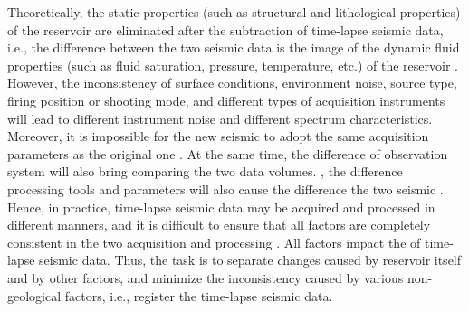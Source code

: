 Theoretically, the static properties (such as structural and lithological properties) of the reservoir are eliminated after the subtraction of time-lapse seismic data, i.e., the difference between the two seismic data is the image of the dynamic fluid properties (such as fluid saturation, pressure, temperature, etc.) of the reservoir  \cite[]{grana2015bayesian}.
However,  the inconsistency of surface conditions, environment noise, source type, firing position or shooting mode, and different types of acquisition instruments will lead to different instrument noise and different spectrum characteristics. 
Moreover, it is impossible for the new seismic  to adopt the same acquisition parameters as the original one  \cite[]{Tucker2000time}. 
At the same time, the difference of observation system will also bring   comparing the two data volumes. 
, the difference  processing tools and parameters will also cause the difference  the two seismic .
Hence, in practice, time-lapse seismic data may be acquired and processed in different manners, and it is difficult to ensure that all factors are completely consistent in the two acquisition and processing . All  factors impact the  of time-lapse seismic data. Thus, the task is to separate changes caused by  reservoir itself and by other factors, and  minimize the inconsistency caused by various non-geological factors, i.e., register the time-lapse seismic data.

